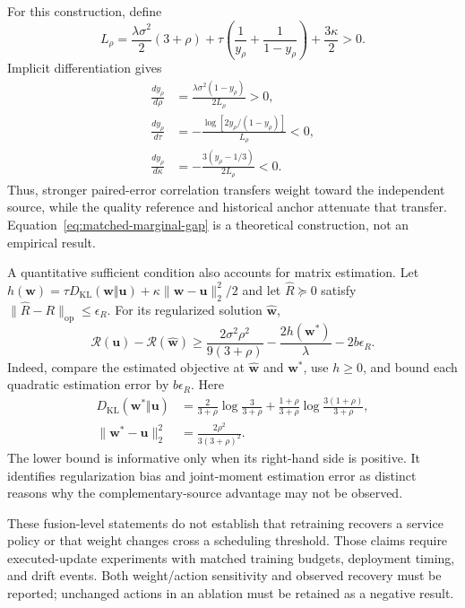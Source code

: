 \documentclass[10pt]{article}
\begin{document}
For this construction, define
\begin{equation}
 L_\rho=\frac{\lambda\sigma^2}{2}(3+\rho)
 +\tau\left(\frac1{y_\rho}+\frac1{1-y_\rho}\right)
 +\frac{3\kappa}{2}>0.
\end{equation}
Implicit differentiation gives
\begin{align}
 \frac{d y_\rho}{d\rho}
 &=\frac{\lambda\sigma^2(1-y_\rho)}{2L_\rho}>0,\\
 \frac{d y_\rho}{d\tau}
 &=-\frac{\log[2y_\rho/(1-y_\rho)]}{L_\rho}<0,\\
 \frac{d y_\rho}{d\kappa}
 &=-\frac{3(y_\rho-1/3)}{2L_\rho}<0.
 \label{eq:correlation-regularization-sensitivity}
\end{align}
Thus, stronger paired-error correlation transfers weight toward the
independent source, while the quality reference and historical anchor
attenuate that transfer. Equation~\eqref{eq:matched-marginal-gap} is a
theoretical construction, not an empirical result.

A quantitative sufficient condition also accounts for matrix estimation.
Let $h(\boldsymbol w)=\tau D_{\mathrm{KL}}(\boldsymbol w\Vert\boldsymbol u)
+\kappa\|\boldsymbol w-\boldsymbol u\|_2^2/2$ and let $\widehat R\succeq0$
satisfy $\|\widehat R-R\|_{\mathrm{op}}\le\epsilon_R$.
For its regularized solution $\widehat{\boldsymbol w}$,
\begin{equation}
 \mathcal R(\boldsymbol u)-\mathcal R(\widehat{\boldsymbol w})
 \ge
 \frac{2\sigma^2\rho^2}{9(3+\rho)}
 -\frac{2h(\boldsymbol w^*)}{\lambda}-2b\epsilon_R.
 \label{eq:estimable-risk-gain}
\end{equation}
Indeed, compare the estimated objective at
$\widehat{\boldsymbol w}$ and $\boldsymbol w^*$, use $h\ge0$, and bound
each quadratic estimation error by $b\epsilon_R$.
Here
\begin{align}
 D_{\mathrm{KL}}(\boldsymbol w^*\Vert\boldsymbol u)
 &=\frac{2}{3+\rho}\log\frac{3}{3+\rho}
 +\frac{1+\rho}{3+\rho}\log\frac{3(1+\rho)}{3+\rho},\\
 \|\boldsymbol w^*-\boldsymbol u\|_2^2
 &=\frac{2\rho^2}{3(3+\rho)^2}.
\end{align}
The lower bound is informative only when its right-hand side is positive.
It identifies regularization bias and joint-moment estimation error as
distinct reasons why the complementary-source advantage may not be observed.

These fusion-level statements do not establish that retraining recovers a
service policy or that weight changes cross a scheduling threshold. Those
claims require executed-update experiments with matched training budgets,
deployment timing, and drift events. Both weight/action sensitivity and
observed recovery must be reported; unchanged actions in an ablation must
be retained as a negative result.
\end{document}
